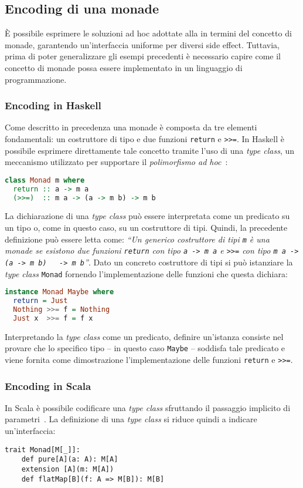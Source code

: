 \subsection{Encoding di una monade}
È possibile esprimere le soluzioni ad hoc adottate alla  in termini del concetto di monade, garantendo un'interfaccia uniforme per diversi side effect.
Tuttavia, prima di poter generalizzare gli esempi precedenti è necessario capire come il concetto di monade possa essere implementato in un linguaggio di programmazione.

\subsubsection{Encoding in Haskell}
Come descritto in precedenza una monade è composta da tre elementi fondamentali: un costruttore di tipo e due funzioni \lstinline{return} e \lstinline{>>=}. In Haskell è possibile esprimere direttamente tale concetto tramite l'uso di una \emph{type class}, un meccanismo utilizzato per supportare il \emph{polimorfismo ad hoc}~\cite{cit:type-classes-in-haskell}:
\begin{lstlisting}[language=haskell]
class Monad m where
  return :: a -> m a
  (>>=)  :: m a -> (a -> m b) -> m b
\end{lstlisting}

La dichiarazione di una \emph{type class} può essere interpretata come un predicato su un tipo o, come in questo caso, su un costruttore di tipi.
Quindi, la precedente definizione può essere letta come: \emph{``Un generico costruttore di tipi \lstinline{m} è una monade se esistono due funzioni \lstinline{return} con tipo \lstinline{a -> m a} e \lstinline{>>=} con tipo \lstinline{m a -> (a -> m b)   -> m b}''}.
Dato un concreto costruttore di tipi si può istanziare la \emph{type class} \lstinline{Monad} fornendo l'implementazione delle funzioni che questa dichiara:
\begin{lstlisting}[language=haskell]
instance Monad Maybe where
  return = Just
  Nothing >>= f = Nothing
  Just x  >>= f = f x
\end{lstlisting}

Interpretando la \emph{type class} come un predicato, definire un'istanza consiste nel provare che lo specifico tipo -- in questo caso \lstinline{Maybe} -- soddisfa tale predicato e viene fornita come dimostrazione l'implementazione delle funzioni \lstinline{return} e \lstinline{>>=}.
 
\subsubsection{Encoding in Scala}
In Scala è possibile codificare una \emph{type class} sfruttando il passaggio implicito di parametri~\cite{cit:type-classes-as-objects-and-implicits}. La definizione di una \emph{type class} si riduce quindi a indicare un'interfaccia:
\begin{lstlisting}[language=scala3]
trait Monad[M[_]]:
	def pure[A](a: A): M[A]
	extension [A](m: M[A])
    def flatMap[B](f: A => M[B]): M[B]
\end{lstlisting}

